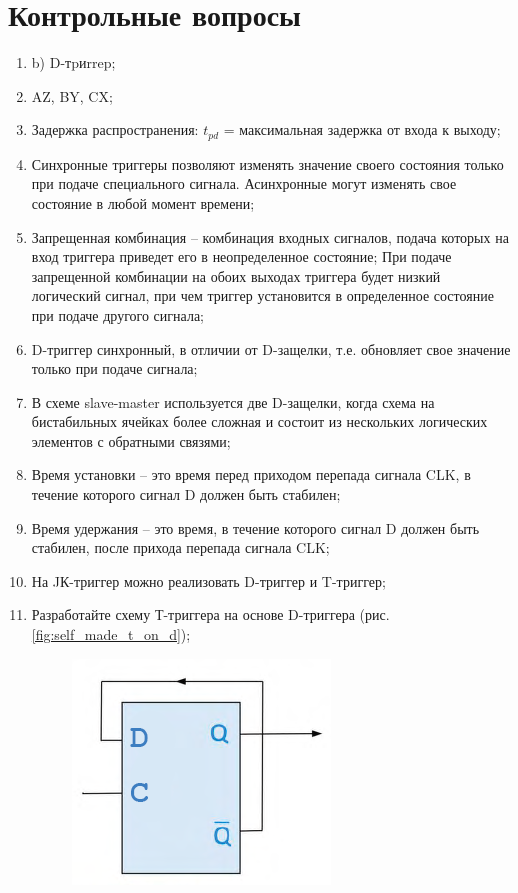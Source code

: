 \documentclass[a4paper,14pt]{article}
\begin{document}
\section{Контрольные вопросы}

\begin{enumerate}
	\item b) D-тpиrrep;
	\item AZ, BY, CX;
	\item Задержка распространения: $t_{pd}$ = максимальная задержка от входа к выходу;
	\item Синхронные триггеры позволяют изменять значение своего состояния только при подаче специального сигнала.
	Асинхронные могут изменять свое состояние в любой момент времени;
	\item Запрещенная комбинация -- комбинация входных сигналов, подача которых на вход триггера приведет его в неопределенное состояние;
	При подаче запрещенной комбинации на обоих выходах триггера будет низкий логический сигнал, при чем триггер установится в определенное состояние при подаче другого сигнала;
	\item D-триггер синхронный, в отличии от D-защелки, т.е. обновляет свое значение только при подаче сигнала;
	\item В схеме slave-master используется две D-защелки, когда схема на бистабильных ячейках более сложная и состоит из нескольких логических элементов с обратными связями;
	\item Время установки -- это время перед приходом перепада сигнала CLK, в течение которого сигнал D должен быть стабилен;
	\item Время удержания -- это время, в течение которого сигнал D должен быть стабилен, после прихода перепада сигнала CLK;
	\item На JК-триггер можно реализовать D-триггер и T-триггер;
	\item Разработайте схему Т-триггера на основе D-триггера (рис. \ref{fig:self_made_t_on_d});
	\begin{figure}[H]
		\centering
		\includegraphics[width=0.6\linewidth]{imgs/self_made_t_on_d}

\end{figure}
\end{enumerate}
\end{document}
